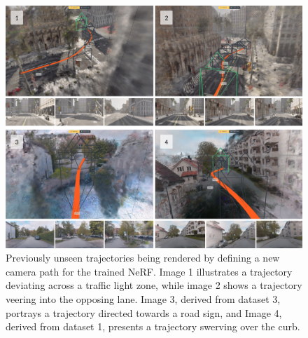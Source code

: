 \begin{figure}[h]
    \centering
    \includegraphics[width=1.0\textwidth]{figures/altered-trajectories.png}
    \caption{Previously unseen trajectories being rendered by defining a new camera path for the trained NeRF. Image 1 illustrates a trajectory deviating across a traffic light zone, while image 2 shows a trajectory veering into the opposing lane. Image 3, derived from dataset 3, portrays a trajectory directed towards a road sign, and Image 4, derived from dataset 1, presents a trajectory swerving over the curb.}
    \label{fig:altered-trajectories}
\end{figure}